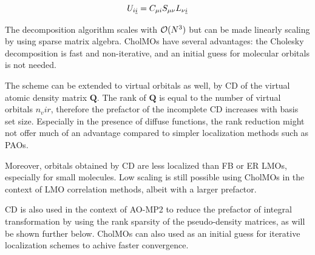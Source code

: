 \begin{equation}
U_{i\underline{i}} = C_{\mu i} S_{\mu \nu} L_{\nu \underline{i}}
\end{equation}

The decomposition algorithm scales with $\mathcal{O}(N^{3})$ but can be made linearly scaling by using sparse matrix algebra. CholMOs have several advantages: the Cholesky decomposition is fast and non-iterative, and an initial guess for molecular orbitals is not needed. 

The scheme can be extended to virtual orbitals as well, by CD of the virtual atomic density matrix $\mathbf{Q}$. The rank of $\mathbf{Q}$ is equal to the number of virtual orbitals $n_vir$, therefore the prefactor of the incomplete CD increases with basis set size. Especially in the presence of diffuse functions, the rank reduction might not offer much of an advantage compared to simpler localization methods such as PAOs.  

Moreover, orbitals obtained by CD are less localized than FB or ER LMOs, especially for small molecules. Low scaling is still possible using CholMOs in the context of LMO correlation methods, albeit with a larger prefactor.

CD is also used in the context of AO-MP2 to reduce the prefactor of integral transformation by using the rank sparsity of the pseudo-density matrices, as will be shown further below. CholMOs can also used as an initial guess for iterative localization schemes to achive faster convergence.

